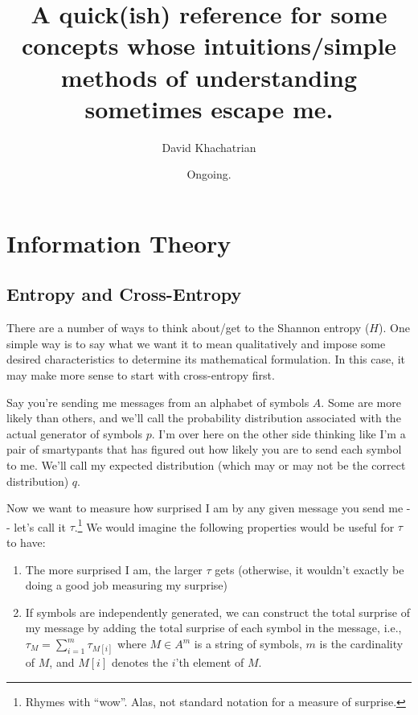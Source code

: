 \documentclass[letterpaper,12pt]{report}
\providecommand{\tightlist}{%
  \setlength{\itemsep}{0pt}\setlength{\parskip}{0pt}}
\begin{document}




\title{A quick(ish) reference for some concepts whose
 intuitions/simple methods of understanding sometimes escape me.}
\author{David Khachatrian}
\date{Ongoing.}

\maketitle

\newpage


\tableofcontents

\newpage


\chapter{Information Theory}\label{information-theory}

\section{Entropy and Cross-Entropy}\label{entropy-and-cross-entropy}

There are a number of ways to think about/get to the Shannon entropy
(\(H\)). One simple way is to say what we want
it to mean qualitatively and impose some desired characteristics to
determine its mathematical formulation. In this case, it may make more
sense to start with cross-entropy first.

Say you're sending me messages from an alphabet of symbols \(A\). Some
are more likely than others, and we'll call the probability distribution
associated with the actual generator of symbols \(p\). I'm over here on
the other side thinking like I'm a pair of smartypants that
has figured out how likely you are to send each symbol to me. We'll call
my expected distribution (which may or may not be the correct
distribution) \(q\).

Now we want to measure how surprised I am by any given message you send
me -\/- let's call it \(\tau\).\footnote{
    Rhymes with ``wow''. 
    Alas, not standard notation for a measure of surprise.
    }
We would imagine the following properties would be useful for \(\tau\) to have:
\begin{enumerate}
  \tightlist
  \item
    The more surprised I am, the larger
    \(\tau\) gets (otherwise, it wouldn't exactly be doing a good job
    measuring my surprise) 
  \item
    If symbols are independently generated, we can
    construct the total surprise of my message by adding the total surprise
    of each symbol in the message, i.e.,
    \(\tau_{M} = \sum_{i=1}^{m} \tau_{M[i]}\) where \(M \in A^m\) is a
    string of symbols, \(m\) is the cardinality of \(M\), and \(M[i]\)
    denotes the \(i\)'th element of \(M\).
\end{enumerate}
\end{document}
